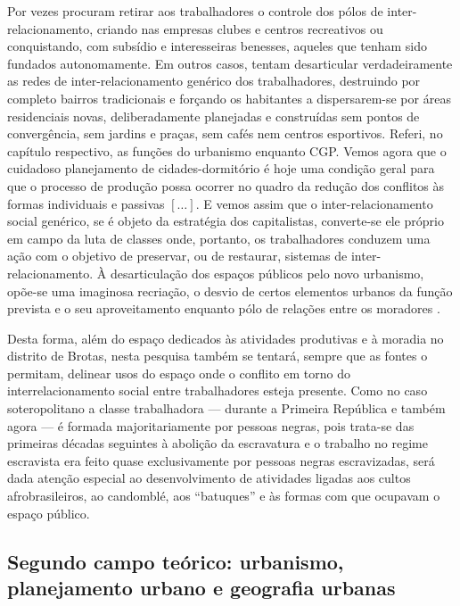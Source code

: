\begin{citacao}
Por vezes procuram retirar aos trabalhadores o controle dos pólos de inter-relacionamento, criando nas empresas clubes e centros recreativos ou conquistando, com subsídio e interesseiras benesses, aqueles que tenham sido fundados autonomamente. Em outros casos, tentam desarticular verdadeiramente as redes de inter-relacionamento genérico dos trabalhadores, destruindo por completo bairros tradicionais e forçando os habitantes a dispersarem-se por áreas residenciais novas, deliberadamente planejadas e construídas sem pontos de convergência, sem jardins e praças, sem cafés nem centros esportivos. Referi, no capítulo respectivo, as funções do urbanismo enquanto CGP. Vemos agora que o cuidadoso planejamento de cidades-dormitório é hoje uma condição geral para que o processo de produção possa ocorrer no quadro da redução dos conflitos às formas individuais e passivas \([\dots]\). E vemos assim que o inter-relacionamento social genérico, se é objeto da estratégia dos capitalistas, converte-se ele próprio em campo da luta de classes onde, portanto, os trabalhadores conduzem uma ação com o objetivo de preservar, ou de restaurar, sistemas de inter-relacionamento. À desarticulação dos espaços públicos pelo novo urbanismo, opõe-se uma imaginosa recriação, o desvio de certos elementos urbanos da função prevista e o seu aproveitamento enquanto pólo de relações entre os moradores \cite[pp.~330-331]{BERNARDO1991}. 
\end{citacao}

Desta forma, além do espaço dedicados às atividades produtivas e à moradia no distrito de Brotas, nesta pesquisa também se tentará, sempre que as fontes o permitam, delinear usos do espaço onde o conflito em torno do interrelacionamento social entre trabalhadores esteja presente. Como no caso soteropolitano a classe trabalhadora --- durante a Primeira República e também agora --- é formada majoritariamente por pessoas negras, pois trata-se das primeiras décadas seguintes à abolição da escravatura e o trabalho no regime escravista era feito quase exclusivamente por pessoas negras escravizadas, será dada atenção especial ao desenvolvimento de atividades ligadas aos cultos afrobrasileiros, ao candomblé, aos ``batuques'' e às formas com que ocupavam o espaço público.

\subsection[Segundo campo teórico: urbanismo, planejamento urbano e geografia urbana]{Segundo campo teórico: urbanismo, planejamento urbano e geografia urbanas}
\label{subsec:sociogeogrurb}

